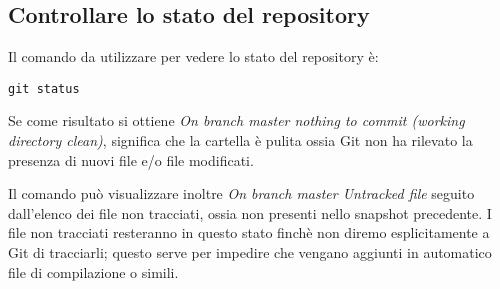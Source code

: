 \subsection{Controllare lo stato del repository}
Il comando da utilizzare per vedere lo stato del repository è:

\begin{center}
\texttt{git status}
\end{center}

Se come risultato si ottiene \textit{On branch master nothing to commit (working directory clean)}, significa che la cartella è pulita ossia Git non ha rilevato la presenza di nuovi file e/o file modificati. 

Il comando può visualizzare inoltre \textit{On branch master Untracked file} seguito dall'elenco dei file non tracciati, ossia non presenti nello snapshot precedente. I file non tracciati resteranno in questo stato finchè non diremo esplicitamente a Git di tracciarli; questo serve per impedire che vengano aggiunti in automatico file di compilazione o simili.